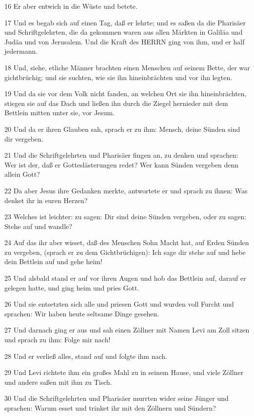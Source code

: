 \par 16 Er aber entwich in die Wüste und betete.
\par 17 Und es begab sich auf einen Tag, daß er lehrte; und es saßen da die Pharisäer und Schriftgelehrten, die da gekommen waren aus allen Märkten in Galiläa und Judäa und von Jerusalem. Und die Kraft des HERRN ging von ihm, und er half jedermann.
\par 18 Und, siehe, etliche Männer brachten einen Menschen auf seinem Bette, der war gichtbrüchig; und sie suchten, wie sie ihn hineinbrächten und vor ihn legten.
\par 19 Und da sie vor dem Volk nicht fanden, an welchen Ort sie ihn hineinbrächten, stiegen sie auf das Dach und ließen ihn durch die Ziegel hernieder mit dem Bettlein mitten unter sie, vor Jesum.
\par 20 Und da er ihren Glauben sah, sprach er zu ihm: Mensch, deine Sünden sind dir vergeben.
\par 21 Und die Schriftgelehrten und Pharisäer fingen an, zu denken und sprachen: Wer ist der, daß er Gotteslästerungen redet? Wer kann Sünden vergeben denn allein Gott?
\par 22 Da aber Jesus ihre Gedanken merkte, antwortete er und sprach zu ihnen: Was denket ihr in euren Herzen?
\par 23 Welches ist leichter: zu sagen: Dir sind deine Sünden vergeben, oder zu sagen: Stehe auf und wandle?
\par 24 Auf das ihr aber wisset, daß des Menschen Sohn Macht hat, auf Erden Sünden zu vergeben, (sprach er zu dem Gichtbrüchigen): Ich sage dir stehe auf und hebe dein Bettlein auf und gehe heim!
\par 25 Und alsbald stand er auf vor ihren Augen und hob das Bettlein auf, darauf er gelegen hatte, und ging heim und pries Gott.
\par 26 Und sie entsetzten sich alle und priesen Gott und wurden voll Furcht und sprachen: Wir haben heute seltsame Dinge gesehen.
\par 27 Und darnach ging er aus und sah einen Zöllner mit Namen Levi am Zoll sitzen und sprach zu ihm: Folge mir nach!
\par 28 Und er verließ alles, stand auf und folgte ihm nach.
\par 29 Und Levi richtete ihm ein großes Mahl zu in seinem Hause, und viele Zöllner und andere saßen mit ihm zu Tisch.
\par 30 Und die Schriftgelehrten und Pharisäer murrten wider seine Jünger und sprachen: Warum esset und trinket ihr mit den Zöllnern und Sündern?

